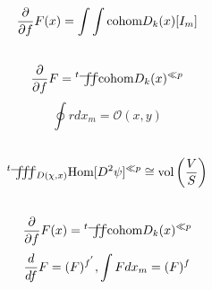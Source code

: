 \documentclass{jsarticle}
\begin{document}
\title{}
\author{}
\date{}
\maketitle


\newcommand{\variint}{%
	\begin{picture}(15,30)
		\put(0,0){
			$ \iint $}
		\put(0,5){\line(15,0){15}}
	\end{picture} %
}

\newcommand{\variiint}{%
	\begin{picture}(20,30)
		\put(0,0){
			$ \iiint $}
		\put(0,5){\line(15,0){20}}
	\end{picture} %
}



 $$ {\partial \over \partial f}F(x) = \int \int \text{cohom}D_k(x)[I_m]  $$
 $$ {\partial \over \partial f}F = {{}^t \variint} \text{cohom}D_k(x)^{\ll p} $$
 $$ \oint r dx_m = \mathcal{O}(x,y) $$
 $$ {{}^t \variiint}_{{D(\chi,x)}} \text{Hom}[D^2 \psi]^{\ll p} \cong 
 \text{vol}\left({V \over S}\right) $$
 $$ {\partial \over \partial f}F(x) = {{}^t \variint} 
 \text{cohom}D_k(x)^{\ll p} $$
 $$ {d \over df}F = (F)^{f^{'}}, \int F dx_m = (F)^{f}  $$
\end{document}
